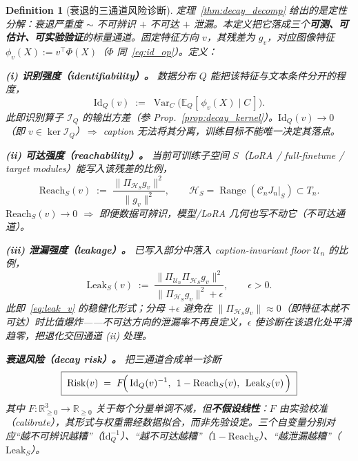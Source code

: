 \documentclass[11pt,a4paper]{article}
\newtheorem{definition}[theorem]{Definition}
\DeclareMathOperator{\Var}{Var}
\newcommand{\E}{\mathbb{E}}
\newcommand{\R}{\mathbb{R}}
\newcommand{\cH}{\mathcal{H}}
\newcommand{\cI}{\mathcal{I}}
\newcommand{\cU}{\mathcal{U}}
\newcommand{\ProjectOp}{\Pi}
\newcommand{\Range}{\operatorname{Range}}
\newcommand{\Center}{\mathcal{C}}
\begin{document}
\begin{definition}[衰退的三通道风险诊断]\label{def:three_channel}
定理~\ref{thm:decay_decomp} 给出的是定性分解：衰退严重度 $\sim$ 不可辨识 $+$ 不可达 $+$ 泄漏。本定义把它落成三个\textbf{可测、可估计、可实验验证}的标量通道。固定特征方向 $v$，其残差为 $g_v$，对应图像特征 $\phi_v(X):=v^\top\Phi(X)$（$\Phi$ 同~\eqref{eq:id_op}）。定义：

\smallskip
\noindent\textbf{(i) 识别强度（identifiability）。} 数据分布 $Q$ 能把该特征与文本条件分开的程度，
\begin{equation}\label{eq:idq}
\mathrm{Id}_Q(v) \;:=\; \Var_C\!\bigl(\E_Q[\,\phi_v(X)\mid C\,]\bigr).
\end{equation}
此即识别算子 $\cI_Q$ 的输出方差（参 Prop.~\ref{prop:decay_kernel}）。$\mathrm{Id}_Q(v)\to 0$（即 $v\in\ker\cI_Q$）$\Rightarrow$ caption 无法将其分离，训练目标不能唯一决定其落点。

\smallskip
\noindent\textbf{(ii) 可达强度（reachability）。} 当前可训练子空间 $S$（LoRA / full-finetune / target modules）能写入该残差的比例，
\begin{equation}\label{eq:reachq}
\mathrm{Reach}_S(v) \;:=\; \frac{\|\ProjectOp_{\cH_S} g_v\|^2}{\|g_v\|^2},\qquad \cH_S=\Range(\Center_n J_n|_S)\subset T_n.
\end{equation}
$\mathrm{Reach}_S(v)\to 0$ $\Rightarrow$ 即便数据可辨识，模型/LoRA 几何也写不动它（不可达通道）。

\smallskip
\noindent\textbf{(iii) 泄漏强度（leakage）。} 已写入部分中落入 caption-invariant floor $\cU_n$ 的比例，
\begin{equation}\label{eq:leakq}
\mathrm{Leak}_S(v) \;:=\; \frac{\|\ProjectOp_{\cU_n}\ProjectOp_{\cH_S} g_v\|^2}{\|\ProjectOp_{\cH_S} g_v\|^2 + \epsilon},\qquad \epsilon>0.
\end{equation}
此即~\eqref{eq:leak_v} 的稳健化形式；分母 $+\epsilon$ 避免在 $\|\ProjectOp_{\cH_S}g_v\|\approx 0$（即特征本就不可达）时比值爆炸——不可达方向的泄漏率不再良定义，$\epsilon$ 使诊断在该退化处平滑趋零，把退化交回通道 (ii) 处理。

\smallskip
\noindent\textbf{衰退风险（decay risk）。} 把三通道合成单一诊断
\begin{equation}\label{eq:riskv}
\boxed{\;
\mathrm{Risk}(v) \;=\; F\!\Bigl(\,\mathrm{Id}_Q(v)^{-1},\;\, 1-\mathrm{Reach}_S(v),\;\, \mathrm{Leak}_S(v)\,\Bigr)\;}
\end{equation}
其中 $F:\R_{\ge 0}^3\to\R_{\ge 0}$ 关于每个分量单调不减，但\textbf{不假设线性}：$F$ 由实验校准（calibrate），其形式与权重需经数据拟合，而非先验设定。三个自变量分别对应“越不可辨识越糟”（$\mathrm{Id}_Q^{-1}$）、“越不可达越糟”（$1-\mathrm{Reach}_S$）、“越泄漏越糟”（$\mathrm{Leak}_S$）。
\end{definition}
\end{document}
